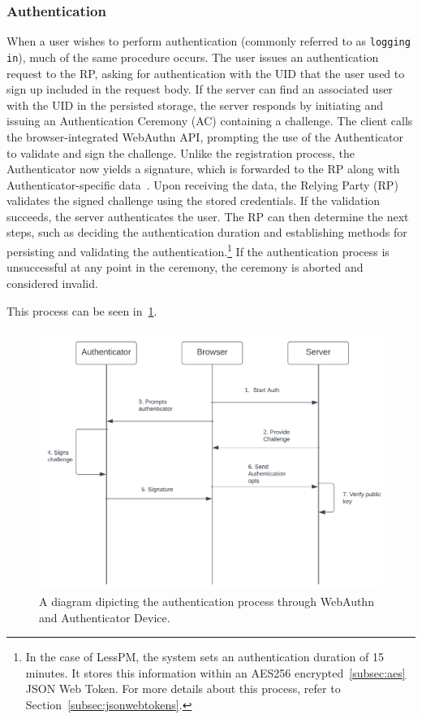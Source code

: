 \subsubsection{Authentication}\label{subsubsec:authentication}
When a user wishes to perform authentication (commonly referred to as \texttt{logging in}), much of the same procedure
occurs.
The user issues an authentication request to the RP, asking for authentication
with the UID that the user used to sign up included in the request body.
If the server can find an associated user with the UID in the persisted storage,
the server responds by initiating and issuing an Authentication Ceremony (AC)
containing a challenge.
The client calls the browser-integrated WebAuthn API, prompting the use of the
Authenticator to validate and sign the challenge.
Unlike the registration process, the Authenticator now yields a signature, which is forwarded to the RP along with
Authenticator-specific data~\cite{webauthn_authenticator_data}.
Upon receiving the data, the Relying Party (RP) validates the signed challenge using the stored credentials.
If the validation succeeds, the server authenticates the user.
The RP can then determine the next steps, such as deciding the authentication
duration and establishing methods for persisting and validating the
authentication.\footnote{
  In the case of LessPM, the system sets an authentication duration of 15 minutes.
  It stores this information within an AES256 encrypted~\ref{subsec:aes} JSON
  Web Token.
  For more details about this process, refer to Section~\ref{subsec:jsonwebtokens}.
} If the authentication process is unsuccessful at any point in the ceremony,
the ceremony is aborted and considered invalid.


This process can be seen in~\ref{fig:authentication}.

\begin{figure}[htbp]
  \centering
  \includegraphics[width=0.8\linewidth]{images/Authentication}
  \caption{\footnotesize A diagram dipicting the authentication process through WebAuthn and Authenticator Device.}
  \label{fig:authentication}
\end{figure}